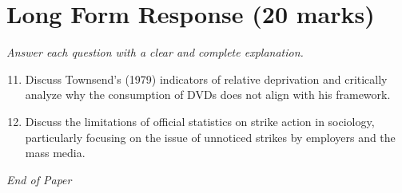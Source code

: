 \documentclass[12pt]{article}
\begin{document}
\section*{Long Form Response (20 marks)}
\textit{Answer each question with a clear and complete explanation.}
\begin{enumerate}[label=\arabic*.]
\setcounter{enumi}{10}
\item Discuss Townsend's (1979) indicators of relative deprivation and critically analyze why the consumption of DVDs does not align with his framework.
\item Discuss the limitations of official statistics on strike action in sociology, particularly focusing on the issue of unnoticed strikes by employers and the mass media.
\end{enumerate}

\vfill
\noindent\textit{End of Paper}
\end{document}
